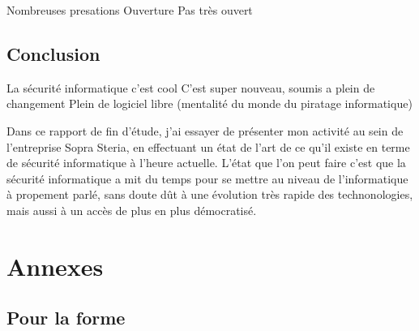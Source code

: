 \documentclass[a4paper]{memoir}
\begin{document}
Nombreuses presations
Ouverture
Pas très ouvert



\chapter*{Conclusion}

La sécurité informatique c'est cool
C'est super nouveau, soumis a plein de changement
Plein de logiciel libre (mentalité du monde du piratage informatique)

Dans ce rapport de fin d'étude, j'ai essayer de présenter mon activité au sein de l'entreprise Sopra Steria, en effectuant un état de l'art de ce qu'il existe en terme de sécurité informatique à l'heure actuelle.
L'état que l'on peut faire c'est que la sécurité informatique a mit du temps pour se mettre au niveau de l'informatique à propement parlé, sans doute dût à une évolution très rapide des technonologies, mais aussi à un accès de plus en plus démocratisé.



\part*{Annexes}
\appendix

\chapter{Pour la forme}


\backmatter%

\nocite{*}



\printindex
\end{document}

